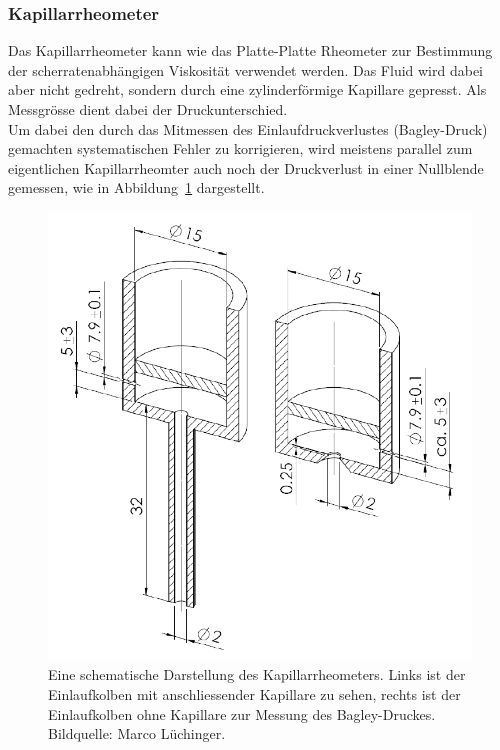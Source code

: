 \subsubsection{Kapillarrheometer}
Das Kapillarrheometer kann wie das Platte-Platte Rheometer zur Bestimmung der scherratenabhängigen Viskosität verwendet werden. Das Fluid wird dabei aber nicht gedreht, sondern durch eine zylinderförmige Ka\-pil\-la\-re gepresst. Als Messgrösse dient dabei der Druckunterschied.\\
Um dabei den durch das Mitmessen des Einlaufdruckverlustes (Bagley-Druck) gemachten systematischen Fehler zu korrigieren, wird meistens parallel zum eigentlichen Kapillarrheomter auch noch der Druckverlust in einer Nullblende gemessen, wie in Abbildung~\ref{fig:kapRheo} dargestellt.
\begin{figure}
    \centering
    \includegraphics[width=\textwidth]{figures/KapRheo.png}
    \caption{Eine schematische Darstellung des Kapillarrheometers. Links ist der Einlaufkolben mit anschliessender Kapillare zu sehen, rechts ist der Einlaufkolben ohne Ka\-pil\-la\-re zur Messung des Bagley-Druckes.\\
    Bildquelle: Marco Lüchinger.}
    \label{fig:kapRheo}
\end{figure}

